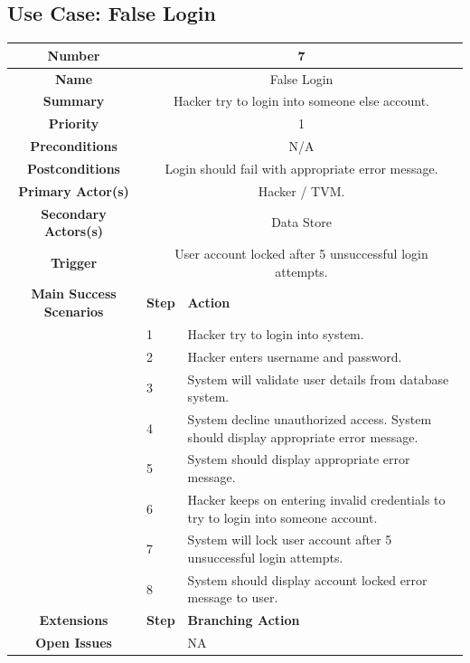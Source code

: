 \documentclass[a4paper,12pt]{report}
\begin{document}

\subsection{Use Case: False Login}
\begin{tabular}{ | c | p{2cm} | p{7cm} |}
	
	\hline
	\textbf{Number} & \multicolumn{2}{c|}{7}  \\
	\hline
	\textbf{Name} & \multicolumn{2}{c|}{False Login}  \\
	\hline
	\textbf{Summary} & \multicolumn{2}{c|}{Hacker try to login into someone else account.}  \\
	\hline
	\textbf{Priority} & \multicolumn{2}{c|}{1}  \\
	\hline
	\textbf{Preconditions} & \multicolumn{2}{c|}{N/A}  \\
	\hline
	\textbf{Postconditions} & \multicolumn{2}{c|}{Login should fail with appropriate error message.}  \\
	\hline
	\textbf{Primary Actor(s)} & \multicolumn{2}{c|}{Hacker / TVM.}  \\
	\hline
	\textbf{Secondary Actors(s)} & \multicolumn{2}{c|}{Data Store}  \\
	\hline
	\textbf{Trigger} & \multicolumn{2}{c|}{User account locked after 5 unsuccessful login attempts.} \\
	\hline
	\textbf{Main Success Scenarios} & \textbf{Step} & \textbf{Action} \\
	\hline
	& 1 & Hacker try to login into system. \\ 
	\hline
	&  2  & Hacker enters username and password. \\
	\hline
	&  3  & System will validate user details from database system. \\
	\hline
	&  4  & System decline unauthorized access. System should display appropriate error message. \\
	\hline
	&  5  & System should display appropriate error message. \\
	\hline
	&  6  & Hacker keeps on entering invalid credentials to try to login into someone account. \\
	\hline
	&  7  & System will lock user account after 5 unsuccessful login attempts. \\
	\hline
	& 8 & System should display account locked error message to user. \\
	\hline
	
	\textbf{Extensions} & \textbf{Step} & \textbf{Branching Action} \\
	\hline
	\textbf{Open Issues} &    & NA \\
	\hline
	
\end{tabular}
\end{document}
